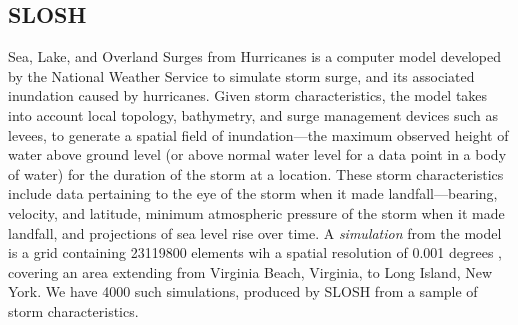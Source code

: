 
\subsection{SLOSH}
Sea, Lake, and Overland Surges from Hurricanes \citep{jelesnianski1992} is a 
    computer model developed by the National Weather Service to simulate storm 
    surge, and its associated inundation caused by hurricanes.   Given storm 
    characteristics, the model takes into account local topology, bathymetry, 
    and surge management devices such as levees, to generate a spatial field of 
    inundation---the maximum observed height of water above ground level 
    (or above normal water level for a data point in a body of water) for the 
    duration of the storm at a location.   These storm characteristics include 
    data pertaining to the eye of the storm when it made landfall---bearing, 
    velocity, and latitude, minimum atmospheric pressure of the storm when it 
    made landfall, and projections of sea level rise over time.  A 
    \emph{simulation} from the model is a grid containing \num{23119800} 
    elements wih a spatial resolution of \num{0.001} degrees , 
    covering an area extending from Virginia Beach, Virginia, to Long Island, 
    New York.  We have \num{4000} such simulations, produced by SLOSH from a 
    sample of storm characteristics.


